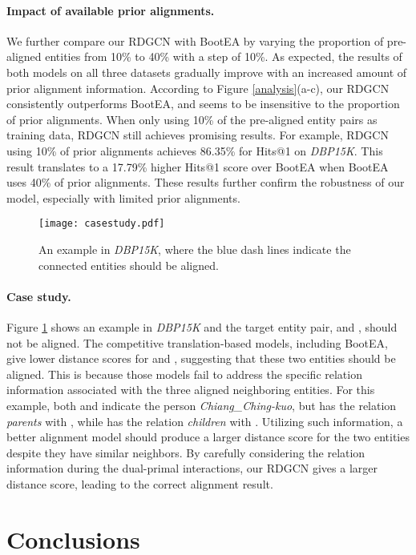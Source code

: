 \documentclass{article}
\begin{document}
\paragraph{Impact of available prior alignments.}
We further compare our RDGCN with BootEA by varying the
proportion of pre-aligned entities from 10\% to 40\% with a step of 10\%. As expected, the results of both models on all three datasets
gradually improve with an increased amount of prior alignment information. According to Figure \ref{analysis}(a-c), our RDGCN consistently outperforms BootEA, and seems to be insensitive to the proportion of prior alignments. When only using 10\% of the pre-aligned entity pairs as training data, RDGCN still
achieves promising results. For example, RDGCN using 10\% of prior alignments achieves 86.35\% for Hits@1 on \textit{DBP15K}. This result
translates to a 17.79\% higher Hits@1 score over BootEA when BootEA uses 40\% of prior alignments. 
These results further confirm the robustness of our model, especially with limited prior alignments. 

\begin{figure}[t!]
	\centering
	\texttt{[image: casestudy.pdf]}
	\caption{An example in \textit{DBP15K}, where the blue dash lines indicate the connected entities should be aligned.
	}
	\label{casestudy}
\end{figure}


\paragraph{Case study.}
Figure \ref{casestudy} shows an example in \textit{DBP15K} 
and the target entity pair,  and , should not be aligned. 
The competitive translation-based models, including BootEA, give lower distance scores for  and , suggesting that these two entities should be aligned. This is because those models fail to address the specific relation information associated with the three aligned neighboring entities. For this example, both  and  indicate the person \emph{Chiang\_Ching-kuo}, but  has the relation \emph{parents} with , while  has the relation \emph{children} with .
Utilizing such information, a better alignment model should produce a
larger distance score for the two entities despite they have similar neighbors. By carefully considering the relation information during
the dual-primal interactions, our RDGCN gives a larger distance score, leading to the correct alignment result.

\section{Conclusions}    
\end{document}
